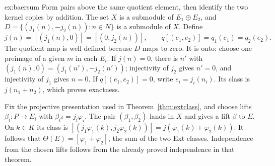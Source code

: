 \begin{solution}{ex:baersum}
\idea Form pairs above the same quotient element, then identify the two kernel copies by addition.
\writeup The set $X$ is a submodule of $E_1\oplus E_2$, and
$D=\{(j_1(n),-j_2(n)):n\in N\}$ is a submodule of $X$. Define
\[
j(n)=[(j_1(n),0)]=[(0,j_2(n))],\qquad
q[(e_1,e_2)]=q_1(e_1)=q_2(e_2).
\]
The quotient map is well defined because $D$ maps to zero. It is onto: choose one preimage of a given $m$ in each $E_i$. If $j(n)=0$, there is $n'$ with
$(j_1(n),0)=(j_1(n'),-j_2(n'))$; injectivity of $j_2$ gives $n'=0$, and injectivity of $j_1$ gives $n=0$. If $q[(e_1,e_2)]=0$, write $e_i=j_i(n_i)$. Its class is $j(n_1+n_2)$, which proves exactness.

Fix the projective presentation used in Theorem~\ref{thm:extclass}, and choose lifts $\beta_i:P\to E_i$ with $\beta_i\iota=j_i\varphi_i$. The pair $(\beta_1,\beta_2)$ lands in $X$ and gives a lift $\beta$ to $E$. On $k\in K$ its class is
$[(j_1\varphi_1(k),j_2\varphi_2(k))]=j(\varphi_1(k)+\varphi_2(k))$.
It follows that $\Theta(E)=[\varphi_1+\varphi_2]$, the sum of the two Ext classes. Independence from the chosen lifts follows from the already proved independence in that theorem.
\end{solution}

